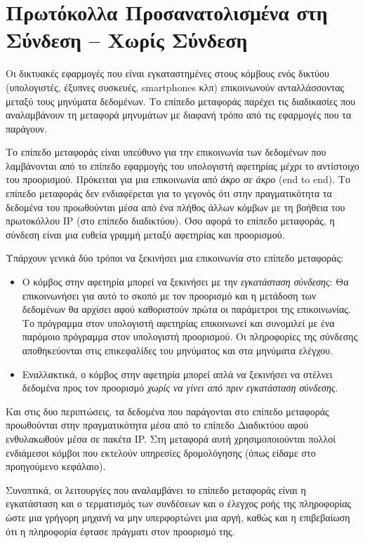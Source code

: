 %
%
\section{Πρωτόκολλα Προσανατολισμένα στη Σύνδεση -- Χωρίς Σύνδεση}

Οι δικτυακές εφαρμογές που είναι εγκαταστημένες στους κόμβους ενός δικτύου (υπολογιστές, έξυπνες συσκευές, smartphones κλπ) επικοινωνούν ανταλλάσσοντας μεταξύ τους μηνύματα δεδομένων. Το επίπεδο μεταφοράς παρέχει τις διαδικασίες που αναλαμβάνουν τη μεταφορά μηνυμάτων με διαφανή τρόπο από τις εφαρμογές που τα παράγουν.

Το επίπεδο μεταφοράς είναι υπεύθυνο για την επικοινωνία των δεδομένων που λαμβάνονται από το επίπεδο εφαρμογής του υπολογιστή αφετηρίας μέχρι το αντίστοιχο του προορισμού. Πρόκειται για μια επικοινωνία από \emph{άκρο σε άκρο} (end to end). Το επίπεδο μεταφοράς δεν ενδιαφέρεται για το γεγονός ότι στην πραγματικότητα τα δεδομένα του προωθούνται μέσα από ένα πλήθος άλλων κόμβων με τη βοήθεια του πρωτοκόλλου IP (στο επίπεδο διαδικτύου). Όσο αφορά το επίπεδο μεταφοράς, η σύνδεση είναι μια ευθεία γραμμή μεταξύ αφετηρίας και προορισμού. 

Υπάρχουν γενικά δύο τρόποι να ξεκινήσει μια επικοινωνία στο επίπεδο μεταφοράς:

\begin{itemize}
\item Ο κόμβος στην αφετηρία μπορεί να ξεκινήσει με την \emph{εγκατάσταση  σύνδεσης}: Θα επικοινωνήσει για αυτό το σκοπό με τον προορισμό και η μετάδοση των δεδομένων θα αρχίσει αφού καθοριστούν πρώτα οι παράμετροι της επικοινωνίας. Το πρόγραμμα στον υπολογιστή αφετηρίας επικοινωνεί και συνομιλεί με ένα παρόμοιο πρόγραμμα στον υπολογιστή προορισμού. Οι πληροφορίες της σύνδεσης αποθηκεύονται στις επικεφαλίδες του μηνύματος και στα μηνύματα ελέγχου.
\item Εναλλακτικά, ο κόμβος στην αφετηρία μπορεί απλά να ξεκινήσει να στέλνει δεδομένα προς τον προορισμό \emph{χωρίς να γίνει από πριν εγκατάσταση σύνδεσης}. 
\end{itemize}

Και στις δυο περιπτώσεις, τα δεδομένα που παράγονται στο επίπεδο μεταφοράς προωθούνται στην πραγματικότητα μέσα από το επίπεδο Διαδικτύου αφού ενθυλακωθούν μέσα σε πακέτα IP. Στη μεταφορά αυτή χρησιμοποιούνται πολλοί ενδιάμεσοι κόμβοι που εκτελούν υπηρεσίες δρομολόγησης (όπως είδαμε στο προηγούμενο κεφάλαιο).

Συνοπτικά, οι λειτουργίες που αναλαμβάνει το επίπεδο μεταφοράς είναι η εγκατάσταση και ο τερματισμός των συνδέσεων και ο έλεγχος ροής της πληροφορίας ώστε μια γρήγορη μηχανή να μην υπερφορτώνει μια αργή, καθώς και η επιβεβαίωση ότι η πληροφορία έφτασε πράγματι στον προορισμό της.

